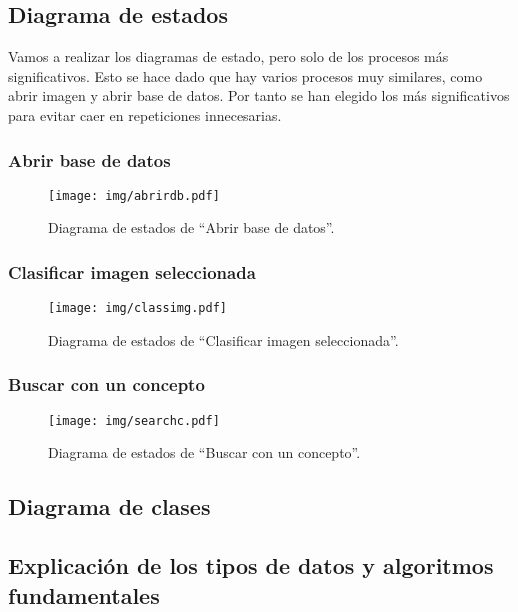 \subsection{Diagrama de estados}

Vamos a realizar los diagramas de estado, pero solo de los procesos más significativos. Esto se hace dado que hay varios procesos muy similares, como abrir imagen y abrir base de datos. Por tanto se han elegido los más significativos para evitar caer en repeticiones innecesarias.

\subsubsection{Abrir base de datos}
\begin{figure}[H]
\begin{center}

\texttt{[image: img/abrirdb.pdf]}
\end{center}

\caption{Diagrama de estados de ``Abrir base de datos''.}
\label{abrirdb}
\end{figure}

\subsubsection{Clasificar imagen seleccionada}
\begin{figure}[H]
\begin{center}

\texttt{[image: img/classimg.pdf]}
\end{center}

\caption{Diagrama de estados de ``Clasificar imagen seleccionada''.}
\label{classimg}
\end{figure}

\subsubsection{Buscar con un concepto}
\begin{figure}[H]
\begin{center}

\texttt{[image: img/searchc.pdf]}
\end{center}

\caption{Diagrama de estados de ``Buscar con un concepto''.}
\label{searchc}
\end{figure}

\subsection{Diagrama de clases}

\subsection{Explicación de los tipos de datos y algoritmos fundamentales}
